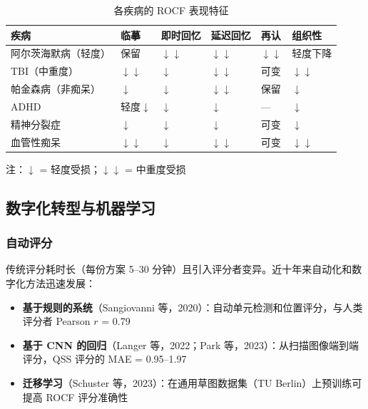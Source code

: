 \documentclass[12pt,a4paper]{ctexart}
\newcommand{\tablefontsize}{\small}
\begin{document}
\begin{table}[h!]
\centering
\tablefontsize
\caption{各疾病的 ROCF 表现特征}
\begin{tabular}{p{3.5cm}p{1.8cm}p{2cm}p{2cm}p{1.8cm}p{2cm}}
\toprule
\textbf{疾病} & \textbf{临摹} & \textbf{即时回忆} & \textbf{延迟回忆} & \textbf{再认} & \textbf{组织性} \\
\midrule
阿尔茨海默病（轻度） & 保留 & $\downarrow\downarrow$ & $\downarrow\downarrow$ & $\downarrow\downarrow$ & 轻度下降 \\
TBI（中重度） & $\downarrow\downarrow$ & $\downarrow$ & $\downarrow\downarrow$ & 可变 & $\downarrow\downarrow$ \\
帕金森病（非痴呆） & $\downarrow$ & $\downarrow$ & $\downarrow\downarrow$ & 保留 & $\downarrow$ \\
ADHD & 轻度$\downarrow$ & $\downarrow$ & $\downarrow$ & — & $\downarrow$ \\
精神分裂症 & $\downarrow$ & $\downarrow$ & $\downarrow$ & 可变 & $\downarrow$ \\
血管性痴呆 & $\downarrow\downarrow$ & $\downarrow$ & $\downarrow\downarrow$ & 可变 & $\downarrow\downarrow$ \\
\bottomrule
\end{tabular}

\vspace{0.3cm}
\tablefontsize
注：$\downarrow$ = 轻度受损；$\downarrow\downarrow$ = 中重度受损
\end{table}

\subsection{数字化转型与机器学习}

\subsubsection{自动评分}

传统评分耗时长（每份方案 5–30 分钟）且引入评分者变异。近十年来自动化和数字化方法迅速发展：

\begin{itemize}
\item \textbf{基于规则的系统}（Sangiovanni 等，2020）：自动单元检测和位置评分，与人类评分者 Pearson $r$ = 0.79
\item \textbf{基于 CNN 的回归}（Langer 等，2022；Park 等，2023）：从扫描图像端到端评分，QSS 评分的 MAE = 0.95–1.97
\item \textbf{迁移学习}（Schuster 等，2023）：在通用草图数据集（TU Berlin）上预训练可提高 ROCF 评分准确性
\end{itemize}
\end{document}
